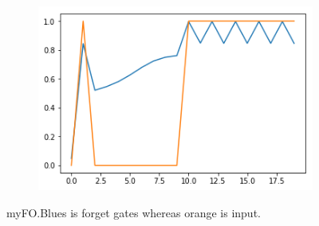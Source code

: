 \documentclass[12pt, letterpaper]{article}
\begin{document}
\begin{figure}[h]
\begin{subfigure}[b]{0.3\textwidth}
        \includegraphics[width=\textwidth]{of_f3}
        \label{fig:mouse}
    \end{subfigure}
    \caption{myFO.Blues is forget gates whereas orange is input.}\label{fig:animals}
\end{figure}
\end{document}
